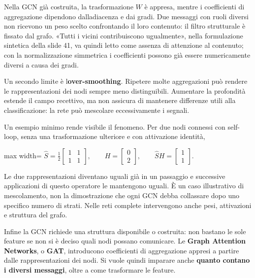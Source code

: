 \documentclass[11pt,a4paper,oneside,openany]{book}
\begin{document}
Nella GCN già costruita, la trasformazione \(W\) è appresa, mentre i coefficienti di aggregazione dipendono dall\textquotesingle adiacenza e dai gradi. Due messaggi con ruoli diversi non ricevono un peso scelto confrontando il loro contenuto: il filtro strutturale è fissato dal grafo. «Tutti i vicini contribuiscono ugualmente», nella formulazione sintetica della slide 41, va quindi letto come assenza di attenzione al contenuto; con la normalizzazione simmetrica i coefficienti possono già essere numericamente diversi a causa dei gradi.

Un secondo limite è l\textquotesingle{}\textbf{over-smoothing}. Ripetere molte aggregazioni può rendere le rappresentazioni dei nodi sempre meno distinguibili. Aumentare la profondità estende il campo recettivo, ma non assicura di mantenere differenze utili alla classificazione: la rete può mescolare eccessivamente i segnali.

Un esempio minimo rende visibile il fenomeno. Per due nodi connessi con self-loop, senza una trasformazione ulteriore e con attivazione identità,

\begin{center}
\begin{adjustbox}{max width=\linewidth}
$\displaystyle \widehat S=\frac12\begin{bmatrix}1&1\\1&1\end{bmatrix},\qquad
H=\begin{bmatrix}0\\2\end{bmatrix},\qquad
\widehat SH=\begin{bmatrix}1\\1\end{bmatrix}.$
\end{adjustbox}
\end{center}

Le due rappresentazioni diventano uguali già in un passaggio e successive applicazioni di questo operatore le mantengono uguali. È un caso illustrativo di mescolamento, non la dimostrazione che ogni GCN debba collassare dopo uno specifico numero di strati. Nelle reti complete intervengono anche pesi, attivazioni e struttura del grafo.

Infine la GCN richiede una struttura disponibile o costruita: non bastano le sole feature se non si è deciso quali nodi possano comunicare. Le \textbf{Graph Attention Networks}, o \textbf{GAT}, introducono coefficienti di aggregazione appresi a partire dalle rappresentazioni dei nodi. Si vuole quindi imparare anche \textbf{quanto contano i diversi messaggi}, oltre a come trasformare le feature.
\end{document}
